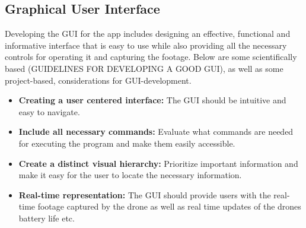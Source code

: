 \subsection{Graphical User Interface} \label{GUI}
Developing the GUI for the app includes designing an effective, functional and informative interface that is easy to use while also providing all the necessary controls for operating it and capturing the footage. Below are some scientifically based (GUIDELINES FOR DEVELOPING A GOOD GUI), as well as some project-based, considerations for GUI-development. 
\\

\begin{itemize}
    \item \textbf{Creating a user centered interface:} The GUI should be intuitive and easy to navigate. 
    \item \textbf{Include all necessary commands:} Evaluate what commands are needed for executing the program and make them easily accessible. 
    \item \textbf{Create a distinct visual hierarchy:} Prioritize important information and make it easy for the user to locate the necessary information. 
    \item \textbf{Real-time representation:} The GUI should provide users with the real-time footage captured by the drone as well as real time updates of the drones battery life etc. 
    
\end{itemize}













